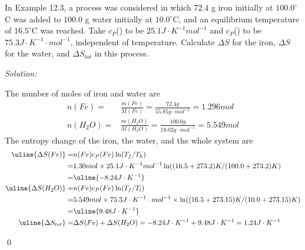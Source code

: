 \documentclass[12pt]{article}
\newenvironment{problem}[2][Problem]{\begin{trivlist}
\item[\hskip \labelsep {\bfseries #1}\hskip \labelsep {\bfseries #2.}]}{\end{trivlist}}
\newenvironment{sol}
    {\emph{Solution:}
    }
    {
    \qed
    }
\begin{document}
\begin{problem}{13.19}
In Example 12.3, a process was considered in which $72.4$ g iron initially at $100.0^{\circ}$C was added to $100.0$ g water initially at $10.0^{\circ}$C, and an equilibrium temperature of $16.5^{\circ}$C was reached. Take $c_P$() to be $25.1J\cdot K^{-1}mol^{-1}$ and $c_P$() to be $75.3J\cdot K^{-1}\cdot mol^{-1}$, independent of temperature. Calculate $\Delta S$ for the iron, $\Delta S$ for the water, and $\Delta S_{tot}$ in this process.
\end{problem}
\begin{sol}
The number of moles of iron and water are
\begin{align*}
n(Fe)=&\frac{m(Fe)}{M(Fe)}=\frac{72.4g}{55.85g\cdot mol^{-1}}=1.296mol\\
n(H_2O)=&\frac{m(H_2O)}{M(H_2O)}=\frac{100.0g}{18.02g\cdot mol^{-1}}=5.549mol
\end{align*}
The entropy change of the iron, the water, and the whole system are
\begin{align*}
\uline{\Delta S(Fe)}=&n(Fe)c_P(Fe)\ln(T_f/T_h)\\
=&1.30mol\times25.1J\cdot K^{-1}mol^{-1}\ln((16.5+273.2)K/(100.0+273.2)K)\\
=&\uline{-8.24J\cdot K^{-1}}\\
\uline{\Delta S(H_2O)}=&n(Fe)c_P(Fe)\ln(T_f/T_l)\\
=&5.549mol\times75.3J\cdot K^{-1}\cdot mol^{-1}\times\ln((16.5+273.15)K/(10.0+273.15)K)\\
=&\uline{9.48J\cdot K^{-1}}\\
\uline{\Delta S_{tot}}=&\Delta S(Fe)+\Delta S(H_2O)=-8.24J\cdot K^{-1}+9.48J\cdot K^{-1}=1.24J\cdot K^{-1}
\end{align*}
\end{sol}
\end{document}

